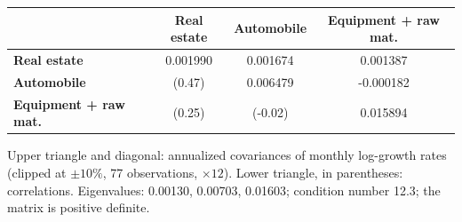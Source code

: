\begin{tabular}{lccc}
\toprule
 & \textbf{Real estate} & \textbf{Automobile} & \textbf{Equipment + raw mat.} \\
\midrule
\textbf{Real estate} & 0.001990 & 0.001674 & 0.001387 \\
\textbf{Automobile} & (0.47) & 0.006479 & -0.000182 \\
\textbf{Equipment + raw mat.} & (0.25) & (-0.02) & 0.015894 \\
\bottomrule
\end{tabular}
\par\smallskip\parbox{\linewidth}{\footnotesize Upper triangle and diagonal: annualized covariances of monthly log-growth rates (clipped at $\pm10\%$, 77 observations, $\times 12$). Lower triangle, in parentheses: correlations. Eigenvalues: 0.00130, 0.00703, 0.01603; condition number 12.3; the matrix is positive definite.}
